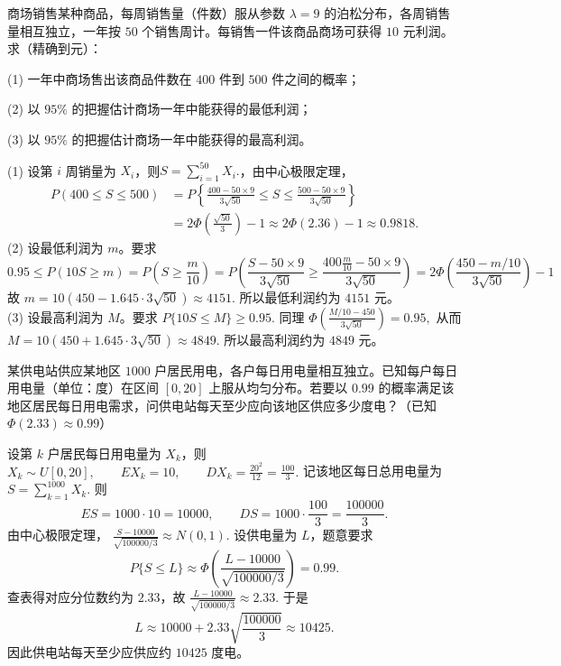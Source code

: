 \documentclass[lang=cn,11pt]{elegantbook}
\begin{document}
\begin{exercise}\label{exer:src-2011-ab-a-05}
商场销售某种商品，每周销售量（件数）服从参数 \(\lambda=9\) 的泊松分布，各周销售量相互独立，一年按 \(50\) 个销售周计。每销售一件该商品商场可获得 \(10\) 元利润。求（精确到元）：\par
(1) 一年中商场售出该商品件数在 \(400\) 件到 \(500\) 件之间的概率；\par
(2) 以 \(95\%\) 的把握估计商场一年中能获得的最低利润；\par
(3) 以 \(95\%\) 的把握估计商场一年中能获得的最高利润。
\end{exercise}
\begin{solution}
(1) 设第 \(i\) 周销量为 \(X_i\)，则\(S=\sum_{i=1}^{50}X_i.\)，由中心极限定理，
\[
\begin{aligned}
P(400\le S\le500)
&=P\left\{\frac{400-50\times9}{3\sqrt{50}}\le S\le
\frac{500-50\times9}{3\sqrt{50}}\right\}\\
&=2\Phi\left(\frac{\sqrt{50}}3\right)-1
\approx2\Phi(2.36)-1\approx0.9818.
\end{aligned}
\]
(2) 设最低利润为 \(m\)。要求
\[
0.95\leqslant P(10S\ge m)=P(S\ge \frac{m}{10})=P\left(\frac{S-50\times9}{3\sqrt{50}}\ge \frac{400\frac{m}{10}-50\times9}{3\sqrt{50}}\right)=2\Phi\left(\frac{450-m/10}{3\sqrt{50}}\right)-1
\]
故
\(
m=10\left(450-1.645\cdot3\sqrt{50}\right)\approx4151.
\)
所以最低利润约为 \(4151\) 元。\\
(3) 设最高利润为 \(M\)。要求
\(
P\{10S\le M\}\ge0.95.
\)
同理
\(
\Phi\left(\frac{M/10-450}{3\sqrt{50}}\right)=0.95,
\)
从而
\(
M=10\left(450+1.645\cdot3\sqrt{50}\right)\approx4849.
\)
所以最高利润约为 \(4849\) 元。
\end{solution}



\begin{exercise}\label{exer:src-2013-a-06}
某供电站供应某地区 \(1000\) 户居民用电，各户每日用电量相互独立。已知每户每日用电量（单位：度）在区间 \([0,20]\) 上服从均匀分布。若要以 \(0.99\) 的概率满足该地区居民每日用电需求，问供电站每天至少应向该地区供应多少度电？（已知 \(\Phi(2.33)\approx0.99\)）
\end{exercise}
\begin{solution}
设第 \(k\) 户居民每日用电量为 \(X_k\)，则
\(
X_k\sim U[0,20],\qquad EX_k=10,\qquad DX_k=\frac{20^2}{12}=\frac{100}{3}.
\)
记该地区每日总用电量为
\(
S=\sum_{k=1}^{1000}X_k.
\)
则
\[
ES=1000\cdot10=10000,\qquad
DS=1000\cdot\frac{100}{3}=\frac{100000}{3}.
\]
由中心极限定理，
\(
\frac{S-10000}{\sqrt{100000/3}}\approx N(0,1).
\)
设供电量为 \(L\)，题意要求
\[
P\{S\le L\}\approx
\Phi\!\left(\frac{L-10000}{\sqrt{100000/3}}\right)=0.99.
\]
查表得对应分位数约为 \(2.33\)，故
\(
\frac{L-10000}{\sqrt{100000/3}}\approx2.33.
\)
于是
\[
L\approx10000+2.33\sqrt{\frac{100000}{3}}\approx10425.
\]
因此供电站每天至少应供应约 \(10425\) 度电。
\end{solution}
\end{document}
